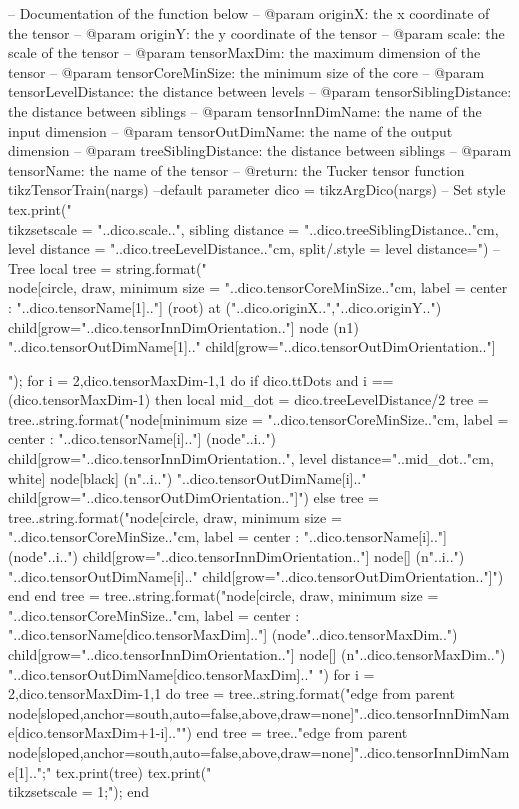 \begin{luacode*}
	-- Documentation of the function below
	-- @param originX: the x coordinate of the tensor
	-- @param originY: the y coordinate of the tensor
	-- @param scale: the scale of the tensor
	-- @param tensorMaxDim: the maximum dimension of the tensor
	-- @param tensorCoreMinSize: the minimum size of the core
	-- @param tensorLevelDistance: the distance between levels
	-- @param tensorSiblingDistance: the distance between siblings
	-- @param tensorInnDimName: the name of the input dimension
	-- @param tensorOutDimName: the name of the output dimension
	-- @param treeSiblingDistance: the distance between siblings
	-- @param tensorName: the name of the tensor
	-- @return: the Tucker tensor
	function tikzTensorTrain(nargs)
		--default parameter
		dico = tikzArgDico(nargs)
		-- Set style
		tex.print("\\tikzset{scale = "..dico.scale..", sibling distance = "..dico.treeSiblingDistance.."cm, level distance = "..dico.treeLevelDistance.."cm, split/.style = {level distance=}}")
		-- Tree
		local tree = string.format("\\node[circle, draw, minimum size = "..dico.tensorCoreMinSize.."cm, label = center : "..dico.tensorName[1].."] (root) at ("..dico.originX..","..dico.originY..") {} child[grow="..dico.tensorInnDimOrientation.."] {node (n1) {"..dico.tensorOutDimName[1].."}} child[grow="..dico.tensorOutDimOrientation.."]{");
		for i = 2,dico.tensorMaxDim-1,1 do
		   	if dico.ttDots and i == (dico.tensorMaxDim-1) then
				local mid_dot = dico.treeLevelDistance/2
			   tree = tree..string.format("node[minimum size = "..dico.tensorCoreMinSize.."cm, label = center : "..dico.tensorName[i].."] (node"..i..") {} child[grow="..dico.tensorInnDimOrientation..", level distance="..mid_dot.."cm, white] {node[black] (n"..i..") {"..dico.tensorOutDimName[i].."}} child[grow="..dico.tensorOutDimOrientation.."]{")
		   	else
		   		tree = tree..string.format("node[circle, draw, minimum size = "..dico.tensorCoreMinSize.."cm, label = center : "..dico.tensorName[i].."] (node"..i..") {} child[grow="..dico.tensorInnDimOrientation.."] {node[] (n"..i..") {"..dico.tensorOutDimName[i].."}} child[grow="..dico.tensorOutDimOrientation.."]{")
			end
		end
		tree = tree..string.format("node[circle, draw, minimum size = "..dico.tensorCoreMinSize.."cm, label = center : "..dico.tensorName[dico.tensorMaxDim].."] (node"..dico.tensorMaxDim..") {} child[grow="..dico.tensorInnDimOrientation.."] {node[] (n"..dico.tensorMaxDim..") {"..dico.tensorOutDimName[dico.tensorMaxDim].."} }")
		for i = 2,dico.tensorMaxDim-1,1 do
		  tree = tree..string.format("edge from parent node[sloped,anchor=south,auto=false,above,draw=none]{"..dico.tensorInnDimName[dico.tensorMaxDim+1-i].."}}")
		end
		tree = tree.."edge from parent node[sloped,anchor=south,auto=false,above,draw=none]{"..dico.tensorInnDimName[1].."}};"
		tex.print(tree)
		tex.print("\\tikzset{scale = 1};");
	end
	
}
\end{luacode*}

